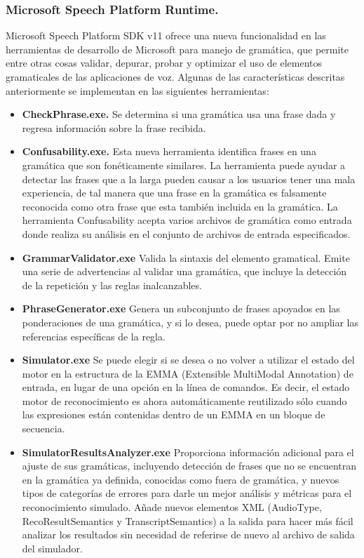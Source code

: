 \documentclass[11pt,a4paper]{article}
\begin{document}
\subsubsection{Microsoft Speech Platform Runtime.}
Microsoft Speech Platform SDK v11 ofrece una nueva funcionalidad en las herramientas de desarrollo de Microsoft para manejo de gramática, que permite entre otras cosas validar, depurar, probar y optimizar el uso de elementos gramaticales de las aplicaciones de voz. Algunas de las características descritas anteriormente se implementan en las siguientes herramientas:
\begin{itemize}
\item \textbf{CheckPhrase.exe.} Se determina si una gramática usa una frase dada y regresa información sobre la frase recibida. %
\item \textbf{Confusability.exe.} Esta nueva herramienta identifica frases en una gramática que son fonéticamente similares. La herramienta puede ayudar a detectar las frases que a la larga pueden causar a los usuarios tener una mala experiencia, de tal manera que una frase en la gramática es falsamente reconocida como otra frase que esta también incluida en la gramática. La herramienta Confusability acepta varios archivos de gramática como entrada donde realiza su análisis en el conjunto de archivos de entrada especificados.
\item \textbf{GrammarValidator.exe} Valida la sintaxis del elemento gramatical. Emite una serie de advertencias al validar una gramática, que incluye la detección de la repetición y las reglas inalcanzables.
\item \textbf{PhraseGenerator.exe} Genera un subconjunto de frases apoyados en las ponderaciones de una gramática, y si lo desea, puede optar por no ampliar las referencias específicas de la regla.
\item \textbf{Simulator.exe} Se puede elegir si se desea o no volver a utilizar el estado del motor en la estructura de la EMMA (Extensible MultiModal Annotation) de entrada, en lugar de una opción en la línea de comandos. Es decir, el estado motor de reconocimiento es ahora automáticamente reutilizado sólo cuando las expresiones están contenidas dentro de un EMMA en un bloque de secuencia.  %
\item \textbf{SimulatorResultsAnalyzer.exe} Proporciona información adicional para el ajuste de sus gramáticas, incluyendo detección de frases que no se encuentran en la gramática ya definida, conocidas como fuera de gramática, y nuevos tipos de categorías de errores para darle un mejor análisis y métricas para el reconocimiento simulado. Añade nuevos elementos XML (AudioType, RecoResultSemantics y TranscriptSemantics) a la salida para hacer más fácil analizar los resultados sin necesidad de referirse de nuevo al archivo de salida del simulador.
\end{itemize} 
\end{document}
